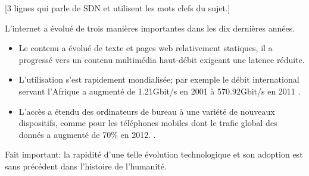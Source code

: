 
 


[3 lignes qui parle de SDN et utilisent les mots clefs du sujet.]

L'internet a évolué de trois manières importantes dans les dix dernières années. 
\begin{itemize}
\item Le contenu a évolué de texte et pages web relativement statiques, il a progressé vers un contenu multimédia haut-débit exigeant une latence réduite. 
\item L'utilisation s'est rapidement mondialisée; par exemple le débit international servant l'Afrique a augmenté de 1.21Gbit/s en 2001 à 570.92Gbit/s en 2011 \cite{InternetGlobalGrowthImpactDevelopingCountries}.
\item  L'accès a étendu des ordinateurs de bureau à une variété de nouveaux dispositifs, comme pour les téléphones mobiles dont le trafic global des donnés a augmenté de 70\% en 2012. \cite{CiscoVNI2013}. 
\end{itemize}
Fait important: la rapidité d'une telle évolution technologique et son adoption est sans précédent dans l'histoire de l'humanité. 


